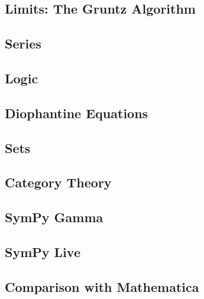 \subsection{Limits: The Gruntz Algorithm}



\subsection{Series}



\subsection{Logic}



\subsection{Diophantine Equations}



\subsection{Sets}


\subsection{Category Theory}


\subsection{SymPy Gamma}\label{sympy-gamma}



\subsection{SymPy Live}\label{sympy-live}



\subsection{Comparison with Mathematica}



